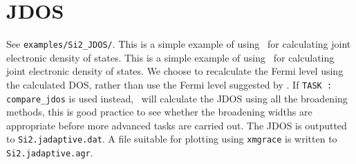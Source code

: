 \documentclass[a4paper,11pt,twoside]{book}
\begin{document}
\section{JDOS}
See  \verb#examples/Si2_JDOS/#. This is a simple example of using \optados\ for calculating joint electronic density of states. This is a simple example of using \optados\ for calculating joint electronic density of states.  We choose to recalculate the Fermi level using the calculated DOS, rather than use the Fermi level suggested by \castep.  If {\tt TASK : compare\_jdos} is used instead, \optados\ will calculate the JDOS using all the broadening methods, this is good practice to see whether the broadening widths are appropriate before more advanced tasks are carried out.  The JDOS is outputted to {\tt Si2.jadaptive.dat}. A file suitable for plotting using {\tt xmgrace} is written to {\tt Si2.jadaptive.agr}. 
\end{document}
